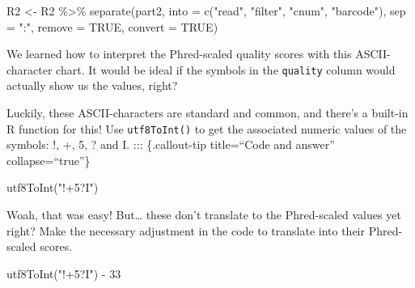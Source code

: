 \documentclass[
  letterpaper,
  DIV=11,
  numbers=noendperiod]{scrreprt}
\newenvironment{Shaded}{}{}
\newcommand{\AttributeTok}[1]{\textcolor[rgb]{0.84,0.23,0.29}{#1}}
\newcommand{\ConstantTok}[1]{\textcolor[rgb]{0.00,0.36,0.77}{#1}}
\newcommand{\DecValTok}[1]{\textcolor[rgb]{0.00,0.36,0.77}{#1}}
\newcommand{\FunctionTok}[1]{\textcolor[rgb]{0.44,0.26,0.76}{#1}}
\newcommand{\NormalTok}[1]{\textcolor[rgb]{0.14,0.16,0.18}{#1}}
\newcommand{\OtherTok}[1]{\textcolor[rgb]{0.44,0.26,0.76}{#1}}
\newcommand{\SpecialCharTok}[1]{\textcolor[rgb]{0.00,0.36,0.77}{#1}}
\newcommand{\StringTok}[1]{\textcolor[rgb]{0.01,0.18,0.38}{#1}}
\begin{document}
\begin{tcolorbox}
\begin{Shaded}
\begin{Highlighting}[]
\NormalTok{R2 }\OtherTok{\textless{}{-}}\NormalTok{ R2 }\SpecialCharTok{\%\textgreater{}\%} \FunctionTok{separate}\NormalTok{(part2,}
                      \AttributeTok{into =} \FunctionTok{c}\NormalTok{(}\StringTok{"read"}\NormalTok{, }\StringTok{"filter"}\NormalTok{, }\StringTok{"cnum"}\NormalTok{, }\StringTok{"barcode"}\NormalTok{),}
                      \AttributeTok{sep =} \StringTok{":"}\NormalTok{,}
                      \AttributeTok{remove =} \ConstantTok{TRUE}\NormalTok{, }\AttributeTok{convert =} \ConstantTok{TRUE}\NormalTok{)}
\end{Highlighting}
\end{Shaded}

We learned how to interpret the Phred-scaled quality scores with this
ASCII-character chart. It would be ideal if the symbols in the
\texttt{quality} column would actually show us the values, right?

Luckily, these ASCII-characters are standard and common, and there's a
built-in R function for this! Use \texttt{utf8ToInt()} to get the
associated numeric values of the symbols: !, +, 5, ? and I. :::
\{.callout-tip title=``Code and answer'' collapse=``true''\}

\begin{Shaded}
\begin{Highlighting}[]
\FunctionTok{utf8ToInt}\NormalTok{(}\StringTok{"!+5?I"}\NormalTok{)}
\end{Highlighting}
\end{Shaded}

\end{tcolorbox}

Woah, that was easy! But\ldots{} these don't translate to the
Phred-scaled values yet right? Make the necessary adjustment in the code
to translate into their Phred-scaled scores.

\begin{tcolorbox}[enhanced jigsaw, arc=.35mm, left=2mm, titlerule=0mm, rightrule=.15mm, colframe=quarto-callout-tip-color-frame, coltitle=black, colback=white, opacityback=0, bottomtitle=1mm, bottomrule=.15mm, colbacktitle=quarto-callout-tip-color!10!white, breakable, title=\textcolor{quarto-callout-tip-color}{\faLightbulb}\hspace{0.5em}{Code and answer}, toptitle=1mm, toprule=.15mm, opacitybacktitle=0.6, leftrule=.75mm]

\begin{Shaded}
\begin{Highlighting}[]
\FunctionTok{utf8ToInt}\NormalTok{(}\StringTok{"!+5?I"}\NormalTok{) }\SpecialCharTok{{-}} \DecValTok{33}
\end{Highlighting}
\end{Shaded}

\end{tcolorbox}
\end{document}
